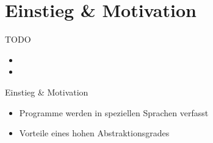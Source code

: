 \section{Einstieg \& Motivation}
\begin{frame}{TODO}
	\begin{itemize}
		\item {}
		\item {}
	\end{itemize}
\end{frame}

\begin{frame}{Einstieg \& Motivation}
	\begin{itemize}
		\item Programme werden in speziellen Sprachen verfasst
		\item Vorteile eines hohen Abstraktionsgrades~
	\end{itemize}


\end{frame}
